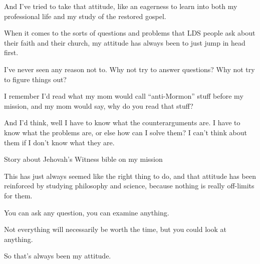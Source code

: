 \begin{compactitem}
			\item And I've tried to take that attitude, like an eagerness to learn into both my professional life and my study of the restored gospel.
				\begin{compactitem}
					\item When it comes to the sorts of questions and problems that LDS people ask about their faith and their church, my attitude has always been to just jump in head first.
					\item I've never seen any reason not to. Why not try to answer questions? Why not try to figure things out? 
					\item I remember I'd read what my mom would call ``anti-Mormon'' stuff before my mission, and my mom would say, why do you read that stuff?
					\item And I'd think, well I have to know what the counterarguments are. I have to know what the problems are, or else how can I solve them? I can't think about them if I don't know what they are.
					\item Story about Jehovah's Witness bible on my mission
					\item This has just always seemed like the right thing to do, and that attitude has been reinforced by studying philosophy and science, because nothing is really off-limits for them.
					\item You can ask any question, you can examine anything.
					\item Not everything will necessarily be worth the time, but you could look at anything.
					\item So that's always been my attitude. %
				\end{compactitem}
				

\end{compactitem}
